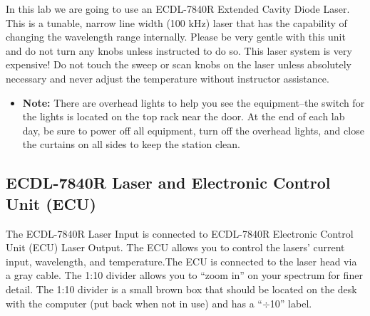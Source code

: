 \documentclass{../lab}
\begin{document}
In this lab we are going to use an ECDL-7840R Extended Cavity Diode Laser. This is a tunable, narrow line width (100 kHz) laser that has the capability of changing the wavelength range internally. Please be very gentle with this unit and do not turn any knobs unless instructed to do so. This laser system is very expensive! Do not touch the sweep or scan knobs on the laser unless absolutely necessary and never adjust the temperature without instructor assistance.

\begin{itemize}
    \item \textbf{Note:} There are overhead lights to help you see the equipment--the switch for the lights is located on the top rack near the door. At the end of each lab day, be sure to power off all equipment, turn off the overhead lights, and close the curtains on all sides to keep the station clean.

\end{itemize}

\subsection{ECDL-7840R Laser and Electronic Control Unit (ECU)}
\label{subsec:ECDL7840RLaser}

The ECDL-7840R Laser Input is connected to ECDL-7840R Electronic Control Unit (ECU) Laser Output. The ECU allows you to control the lasers' current input, wavelength, and temperature.The ECU is connected to the laser head via a gray cable. The 1:10 divider allows you to ``zoom in'' on your spectrum for finer detail. The 1:10 divider is a small brown box that should be located on the desk with the computer (put back when not in use) and has a ``$\div$10'' label.
\end{document}

